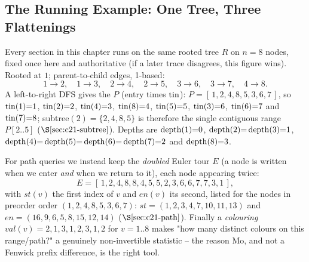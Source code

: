 \subsection*{The Running Example: One Tree, Three Flattenings}

Every section in this chapter runs on the same rooted tree \(R\) on \(n=8\)
nodes, fixed once here and authoritative (if a later trace disagrees, this
figure wins).  Rooted at \(1\); parent-to-child edges, 1-based:
\[
  1\!\to\!2,\quad 1\!\to\!3,\quad 2\!\to\!4,\quad 2\!\to\!5,\quad
  3\!\to\!6,\quad 3\!\to\!7,\quad 4\!\to\!8 .
\]
A left-to-right DFS gives the  \(P\) (entry times
\(\operatorname{tin}\)): \(P=[\,1,2,4,8,5,3,6,7\,]\), so \(\operatorname{tin}(1){=}1\), \(\operatorname{tin}(2){=}2\),
\(\operatorname{tin}(4){=}3\), \(\operatorname{tin}(8){=}4\), \(\operatorname{tin}(5){=}5\), \(\operatorname{tin}(3){=}6\),
\(\operatorname{tin}(6){=}7\) and \(\operatorname{tin}(7){=}8\); subtree\((2)=\{2,4,8,5\}\) is therefore the
single contiguous range \(P[2..5]\) (\(\secref{c21-subtree}\)).  Depths are
\(\operatorname{depth}(1){=}0\), \(\operatorname{depth}(2){=}\operatorname{depth}(3){=}1\),
\(\operatorname{depth}(4){=}\operatorname{depth}(5){=}\operatorname{depth}(6){=}\operatorname{depth}(7){=}2\) and \(\operatorname{depth}(8){=}3\).

For path queries we instead keep the \emph{doubled} Euler tour \(E\) (a node is
written when we enter \emph{and} when we return to it), each node appearing twice:
\[
  E=[\,1,2,4,8,8,4,5,5,2,3,6,6,7,7,3,1\,] ,
\]
with \(st(v)\) the first index of \(v\) and \(en(v)\) its second, listed for the
nodes in preorder order \((1,2,4,8,5,3,6,7)\):
\(st{=}(1,2,3,4,7,10,11,13)\) and \(en{=}(16,9,6,5,8,15,12,14)\)
(\(\secref{c21-path}\)).  Finally a \emph{colouring}
\(\mathit{val}(v)=2,1,3,1,2,3,1,2\) for \(v=1..8\) makes "how many distinct colours on
this range/path?" a genuinely non-invertible statistic -- the reason Mo, and not
a Fenwick prefix difference, is the right tool.

